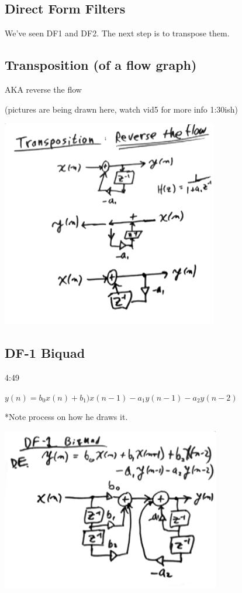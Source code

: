 
\subsection*{Direct Form Filters}
We've seen DF1 and DF2. The next step is to transpose them.

\subsection*{Transposition (of a flow graph)}

AKA reverse the flow

(pictures are being drawn here, watch vid5 for more info 1:30ish)



\includegraphics[scale=0.5]{frames/5_a}


\subsection*{DF-1 Biquad}

4:49


$y(n) = b_0x(n) + b_1)x(n - 1)  -
a_1 y(n - 1) - a_2 y(n - 2)
$

*Note process on how he draws it.

\includegraphics[scale=0.5]{frames/5_b}


